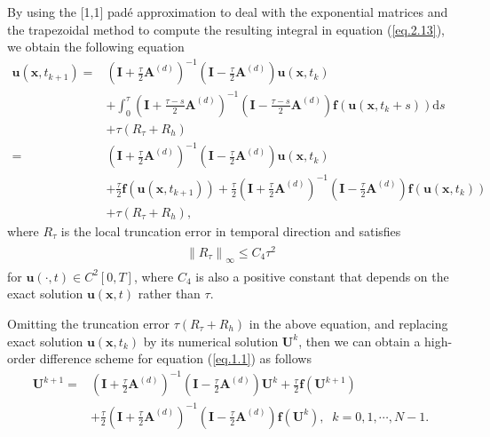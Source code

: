 \documentclass{siamart171218}
\numberwithin{theorem}{section}
\numberwithin{equation}{section}
\newcommand{\vecx}{\boldsymbol{x}}
\begin{document}
By using the [1,1] pad\'{e} approximation \cite{Moler2003} to
deal with the exponential matrices and
the trapezoidal method to compute
the resulting integral in equation (\ref{eq.2.13}), we obtain the
 following equation
\begin{equation}\label{eq.2.14}
\begin{aligned}\displaystyle
\mathbf{u}\left(\vecx,t_{k+1}\right)=&\left(
\mathbf{I}+\frac{\tau}{2}\mathbf{A}^{(d)}
\right)^{-1}\left(
\mathbf{I}-\frac{\tau}{2}\mathbf{A}^{(d)}
\right)
\mathbf{u}\left(\vecx,t_{k}\right)
\\&+\int_{0}^{\tau}
\left(
\mathbf{I}+\frac{\tau-s}{2}\mathbf{A}^{(d)}
\right)^{-1}\left(
\mathbf{I}-\frac{\tau-s}{2}\mathbf{A}^{(d)}
\right)
\mathbf{f}\left(\mathbf{u}\left(\vecx,t_{k}+s\right)\right)\mathrm{d}s
\\&+\tau \left(R_\tau+ R_h\right)\\
=&\left(
\mathbf{I}+\frac{\tau}{2}\mathbf{A}^{(d)}
\right)^{-1}\left(
\mathbf{I}-\frac{\tau}{2}\mathbf{A}^{(d)}
\right)\mathbf{u}\left(\vecx,t_{k}\right)
\\&+\frac{\tau}{2}\mathbf{f}\left(\mathbf{u}\left(\vecx,t_{k+1}\right)\right)+
\frac{\tau}{2}\left(
\mathbf{I}+\frac{\tau}{2}\mathbf{A}^{(d)}
\right)^{-1}\left(
\mathbf{I}-\frac{\tau}{2}\mathbf{A}^{(d)}
\right)
\mathbf{f}\left(\mathbf{u}\left(\vecx,t_{k}\right)\right)\\&
+\tau \left(R_\tau+ R_h\right),
\end{aligned}
\end{equation}
where $R_\tau$ is the local truncation error in temporal direction and satisfies
\begin{eqnarray}\label{eq.2.15}
\begin{array}{lll}\displaystyle
\left\|R_\tau\right\|_\infty\leq C_4\tau^2
\end{array}
\end{eqnarray}
for $\mathbf{u}(\cdot,t)\in{C}^{2}\left[0,T\right]$,
where $C_4$ is also a positive constant that depends on the exact
solution $\mathbf{u}(\vecx,t)$ rather than $\tau$.

Omitting the truncation error $\tau \left(R_\tau+ R_h\right)$
 in the above equation, and replacing exact solution $\mathbf{u}\left(\vecx,t_{k}\right)$ by its
numerical solution $\mathbf{U}^{k}$, then we can obtain
a high-order difference scheme for equation (\ref{eq.1.1}) as follows
\begin{equation}\label{eq.2.16}
\begin{aligned}\displaystyle
\mathbf{U}^{k+1}=&\left(
\mathbf{I}+\frac{\tau}{2}\mathbf{A}^{(d)}
\right)^{-1}\left(
\mathbf{I}-\frac{\tau}{2}\mathbf{A}^{(d)}
\right)\mathbf{U}^{k}+
\frac{\tau}{2}\mathbf{f}
\left(\mathbf{U}^{k+1}\right)\\&+
\frac{\tau}{2}\left(
\mathbf{I}+\frac{\tau}{2}\mathbf{A}^{(d)}
\right)^{-1}\left(
\mathbf{I}-\frac{\tau}{2}\mathbf{A}^{(d)}
\right)\mathbf{f}\left(\mathbf{U}^{k}\right)
,\;\;k=0,1,\cdots,N-1.
\end{aligned}
\end{equation}
\end{document}
